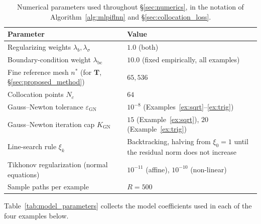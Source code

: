 \documentclass[11pt, a4paper]{article}
\theoremstyle{theoremstyle}
\theoremstyle{definitionstyle}
\begin{document}
\begin{table}[htbp]
    \centering
    \caption{Numerical parameters used throughout \S\ref{sec:numerics}, in the notation of Algorithm~\ref{alg:mlpiflnn} and \S\ref{sec:collocation_loss}.}
    \label{tab:numerical_parameters}
    \begin{tabular}{@{}p{}p{}@{}}
        \toprule
        Parameter & Value \\
        \midrule
        Regularizing weights $\lambda_b, \lambda_\sigma$ & $1.0$ (both) \\
        Boundary-condition weight $\lambda_{\mathrm{bc}}$ & $10.0$ (fixed empirically, all examples) \\
        Fine reference mesh $n^*$ (for $\mathbf T$, \S\ref{sec:proposed_method}) & $65{,}536$ \\
        Collocation points $N_c$ & $64$ \\
        Gauss--Newton tolerance $\varepsilon_{\mathrm{GN}}$ & $10^{-8}$ (Examples~\ref{ex:sqrt}--\ref{ex:trig}) \\
        Gauss--Newton iteration cap $K_{\mathrm{GN}}$ & $15$ (Example~\ref{ex:sqrt}), $20$ (Example~\ref{ex:trig}) \\
        Line-search rule $\xi_k$ & Backtracking, halving from $\xi_0=1$ until the residual norm does not increase \\
        Tikhonov regularization (normal equations) & $10^{-11}$ (affine), $10^{-10}$ (non-linear) \\
        Sample paths per example & $R = 500$ \\
        \bottomrule
    \end{tabular}
\end{table}

Table~\ref{tab:model_parameters} collects the model coefficients used in each of the four examples below.
\end{document}
